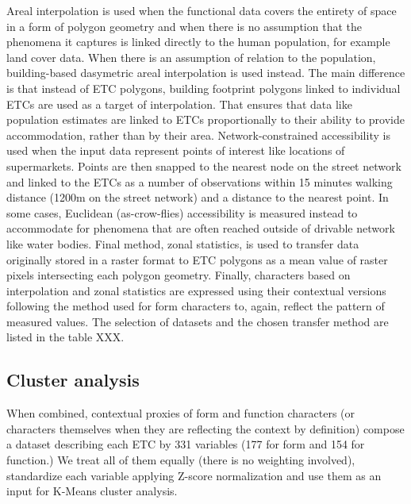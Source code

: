 Areal interpolation is used when the functional data covers the entirety of space in a
form of polygon geometry and when there is no assumption that the phenomena it captures
is linked directly to the human population, for example land cover data. When there is
an assumption of relation to the population, building-based dasymetric areal
interpolation is used instead. The main difference is that instead of ETC polygons,
building footprint polygons linked to individual ETCs are used as a target of
interpolation. That ensures that data like population estimates are linked to ETCs
proportionally to their ability to provide accommodation, rather than by their area.
Network-constrained accessibility is used when the input data represent points of
interest like locations of supermarkets. Points are then snapped to the nearest node on
the street network and linked to the ETCs as a number of observations within 15 minutes
walking distance (1200m on the street network) and a distance to the nearest point. In
some cases, Euclidean (as-crow-flies) accessibility is measured instead to accommodate
for phenomena that are often reached outside of drivable network like water bodies.
Final method, zonal statistics, is used to transfer data originally stored in a raster
format to ETC polygons as a mean value of raster pixels intersecting each polygon
geometry. Finally, characters based on interpolation and zonal statistics are expressed
using their contextual versions following the method used for form characters to, again,
reflect the pattern of measured values. The selection of datasets and the chosen
transfer method are listed in the table XXX.

\subsection*{Cluster analysis}



When combined, contextual proxies of form and function characters (or characters
themselves when they are reflecting the context by definition) compose a dataset
describing each ETC by 331 variables (177 for form and 154 for function.) We treat all
of them equally (there is no weighting involved), standardize each variable applying
Z-score normalization and use them as an input for K-Means cluster analysis.

